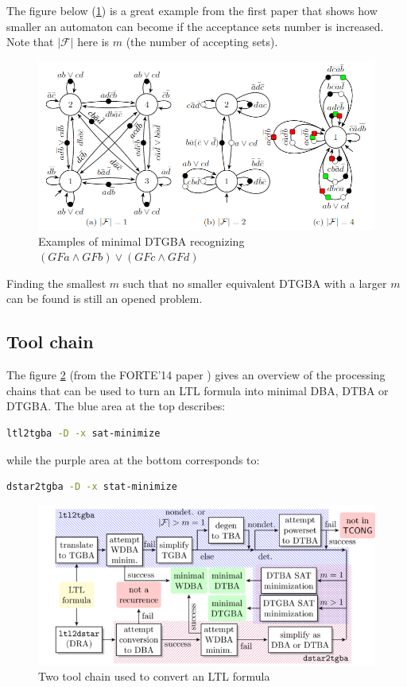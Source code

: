 \noindent The figure below (\ref{fig:accsets}) is a great example from the first paper \cite{14} that shows how
smaller an automaton can become if the acceptance sets number is increased. Note that $|\mathcal{F}|$ here
is $m$ (the number of accepting sets).
\begin{figure}[H]
 \centering
 \includegraphics[scale=0.5]{img/accsets_reduction.png}
 \caption{Examples of minimal DTGBA recognizing $(GFa \land GFb) \lor (GFc \land GFd)$}
 \label{fig:accsets}
\end{figure}

Finding the smallest $m$ such that no smaller equivalent DTGBA with a larger $m$ can be found is
still an opened problem.

\subsection{Tool chain}
The figure \ref{fig:tool_chain} (from the FORTE'14 paper \cite{14}) gives an overview of the processing
chains that can be used to turn an LTL formula \cite{13} into minimal DBA, DTBA or DTGBA.
The blue area at the top describes:
\begin{lstlisting}[language=bash,caption={bash command-line to translate a formula using ltl2tgba}]
  ltl2tgba -D -x sat-minimize
\end{lstlisting}

\noindent while the purple area at the bottom corresponds to:
\begin{lstlisting}[language=bash,caption={bash command-line to translate a formula using dstar2tgba}]
  dstar2tgba -D -x stat-minimize
\end{lstlisting}

\begin{figure}[H]
 \centering
 \includegraphics[scale=0.7]{img/tool_chain.png}
 \caption{Two tool chain used to convert an LTL formula}
 \label{fig:tool_chain}
\end{figure}

